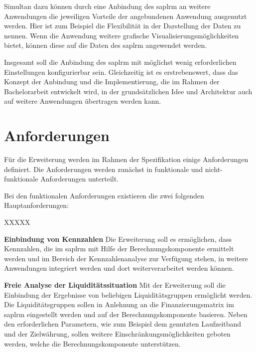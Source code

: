 \begin{onehalfspacing}
Simultan dazu können durch eine Anbindung des \gls{saplrm} an weitere Anwendungen die jeweiligen Vorteile der angebundenen Anwendung ausgenutzt werden. Hier ist zum Beispiel die Flexibilität in der Darstellung der Daten zu nennen. Wenn die Anwendung weitere grafische Visualisierungsmöglichkeiten bietet, können diese auf die Daten des \gls{saplrm} angewendet werden.

Insgesamt soll die Anbindung des \gls{saplrm} mit möglichst wenig erforderlichen Einstellungen konfigurierbar sein. Gleichzeitig ist es erstrebenswert, dass das Konzept der Anbindung und die Implementierung, die im Rahmen der Bachelorarbeit entwickelt wird, in der grundsätzlichen Idee und Architektur auch auf weitere Anwendungen übertragen werden kann.

\section{Anforderungen}
\label{sec:anforderungen}
Für die Erweiterung werden im Rahmen der Spezifikation einige Anforderungen definiert. Die Anforderungen werden zunächst in funktionale und nicht-funktionale Anforderungen unterteilt. 

Bei den funktionalen Anforderungen existieren die zwei folgenden Hauptanforderungen:

\begin{seToplist}{ XXXXX }

\item[\anfl{kpi}] \textbf{Einbindung von Kennzahlen} \newline
Die Erweiterung soll es ermöglichen, dass Kennzahlen, die im \gls{saplrm} mit Hilfe der Berechnungskomponente ermittelt werden und im Bereich der Kennzahlenanalyse zur Verfügung stehen, in weitere Anwendungen integriert werden und dort weiterverarbeitet werden können.

\item[\anfl{fundingMatrix}] \textbf{Freie Analyse der Liquiditätssituation} \newline
Mit der Erweiterung soll die Einbindung der Ergebnisse von beliebigen Liquiditätsgruppen ermöglicht werden. Die Liquiditätsgruppen sollen in Anlehnung an die Finanzierungsmatrix im \gls{saplrm} eingestellt werden und auf der Berechnungskomponente basieren. Neben den erforderlichen Parametern, wie zum Beispiel dem genutzten Laufzeitband und der Zielwährung, sollen weitere Einschränkungsmöglichkeiten geboten werden, welche die Berechnungskomponente unterstützen.

\end{seToplist}


\end{onehalfspacing}
